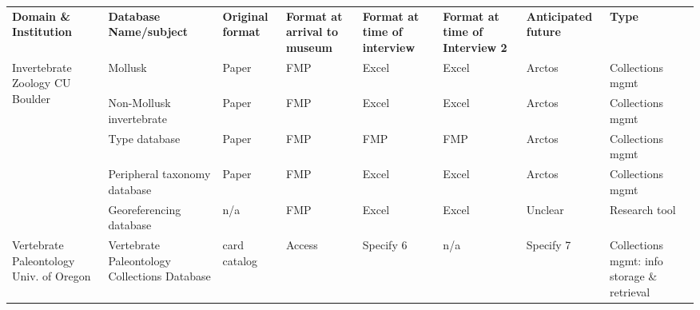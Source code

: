 \begin{tabular}{llllllll}
\textbf{Domain \& Institution}                           & \textbf{Database Name/subject}               & \textbf{Original format} & \textbf{Format at arrival to museum}     & \textbf{Format at time of interview} & \textbf{Format at time of Interview 2} & \textbf{Anticipated future} & \textbf{Type}                               \\
\multirow{5}{*}{Invertebrate Zoology CU Boulder}         & Mollusk                                      & Paper                    & FMP                                      & Excel                                & Excel                                  & Arctos                      & Collections mgmt                            \\
                                                         & Non-Mollusk invertebrate                     & Paper                    & FMP                                      & Excel                                & Excel                                  & Arctos                      & Collections mgmt                            \\
                                                         & Type database                                & Paper                    & FMP                                      & FMP                                  & FMP                                    & Arctos                      & Collections mgmt                            \\
                                                         & Peripheral taxonomy database                 & Paper                    & FMP                                      & Excel                                & Excel                                  & Arctos                      & Collections mgmt                            \\
                                                         & Georeferencing database                      & n/a                      & FMP                                      & Excel                                & Excel                                  & Unclear                     & Research tool                               \\
\multirow{2}{*}{Vertebrate Paleontology Univ. of Oregon} & Vertebrate Paleontology Collections Database & card catalog             & Access                                   & Specify 6                            & n/a                                    & Specify 7                   & Collections mgmt: info storage \& retrieval \\

\end{tabular}
